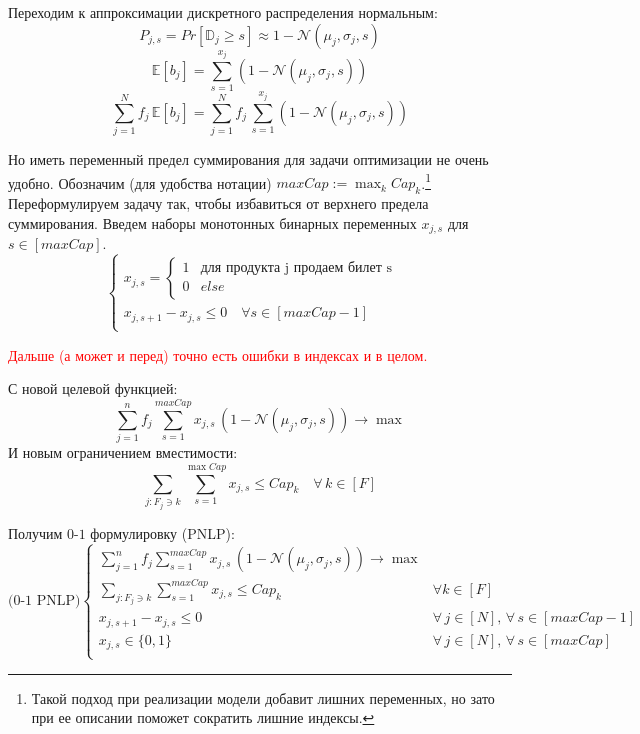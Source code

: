 \documentclass[reqno]{article}
\theoremstyle{definition}
\theoremstyle{definition}
\theoremstyle{definition}
\theoremstyle{definition}
\theoremstyle{definition}
\theoremstyle{definition}
\theoremstyle{definition}
\theoremstyle{definition}
\theoremstyle{definition}
\begin{document}
		Переходим к аппроксимации дискретного распределения нормальным:
		$$P_{j,s} = Pr[\mathds{D}_j \geq s] \approx 1 - \mathcal{N}(\mu_j, \sigma_j, s)$$
		$$\mathds{E}[b_j] = \sum\limits_{s = 1}^{x_j} (1 - \mathcal{N}(\mu_j, \sigma_j, s))$$
		$$\sum\limits^N_{j = 1} f_j\,\mathds{E}[b_j] = \sum\limits^N_{j = 1} f_j\,\sum\limits_{s = 1}^{x_j} (1 - \mathcal{N}(\mu_j, \sigma_j, s))$$
		
		Но иметь переменный предел суммирования для задачи оптимизации не очень удобно. Обозначим (для удобства нотации) $maxCap := \max_k Cap_k$.\footnote{Такой подход при реализации модели добавит лишних переменных, но зато при ее описании поможет сократить лишние индексы.} Переформулируем задачу так, чтобы избавиться от верхнего предела суммирования. Введем наборы монотонных бинарных переменных $x_{j,s}$ для $s \in [maxCap]$.
		$$
		\begin{cases}
			x_{j,s} =
		\begin{cases}
			1 & \text{для продукта j продаем билет s}\\
			0 & else\\
		\end{cases} & \\
		x_{j,s + 1} - x_{j, s} \leq 0\quad \forall s \in [maxCap - 1] & \\
		\end{cases}
		$$
		
		\textcolor{red}{Дальше (а может и перед) точно есть ошибки в индексах и в целом.}
		
		С новой целевой функцией:
		$$\sum\limits^n_{j = 1} f_j \sum\limits^{maxCap}_{s = 1} x_{j, s}\,(1 - \mathcal{N}(\mu_j, \sigma_j, s)) \rightarrow \max$$
		И новым ограничением вместимости:
		$$\sum\limits_{j : F_j \ni k} \sum\limits^{\max Cap}_{s = 1} x_{j, s} \leq Cap_k \quad \forall\, k \in [F]$$
		
		Получим $0$-$1$ формулировку (PNLP):
		$$
		\text{(0-1 PNLP)}
		\begin{cases}
			\sum\limits^n_{j = 1} f_j \sum\limits^{maxCap}_{s = 1} x_{j, s}\,(1 - \mathcal{N}(\mu_j, \sigma_j, s)) \rightarrow \max & \\
			\sum\limits_{j : F_j \ni k} \sum\limits^{maxCap}_{s = 1} x_{j, s} \leq Cap_k & \forall k \in [F] \\
			x_{j,s + 1} - x_{j, s} \leq 0 \quad & \forall\, j \in [N],\, \forall\, s \in [maxCap - 1] \\
			x_{j, s} \in \{0, 1\} &  \forall\, j \in [N],\, \forall\, s \in [maxCap] \\
		\end{cases}
		$$
		
\end{document}
